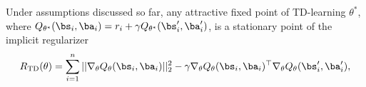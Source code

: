 \begin{theorem}
\label{thm:implicit_noise_reg}
Under assumptions discussed so far, any attractive fixed point of TD-learning  $\theta^*$, where $Q_{\theta^*}(\bs_i, \ba_i) = r_i + \gamma Q_{\theta^*}(\bs'_i, \ba'_i)$,
is a stationary point of the implicit regularizer
\begin{equation}
\label{eqn:regularizer}
    R_\mathrm{TD}(\theta) = \sum_{i=1}^n || \nabla_\theta Q_\theta(\bs_i, \ba_i)||_2^2 - \gamma \nabla_\theta Q_\theta(\bs_i, \ba_i)^\top \nabla_\theta Q_\theta(\bs'_i, \ba'_i) ,
\end{equation}
\end{theorem}
